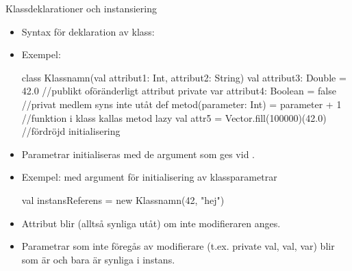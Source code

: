 \begin{Slide}{Klassdeklarationer och instansiering}\SlideFontSmall
\setlength{\leftmargini}{0pt}
\begin{itemize}
\item Syntax för deklaration av klass: \\ \vspace{0.5em}
\item Exempel: 
\begin{Code}
class Klassnamn(val attribut1: Int, attribut2: String){
  val attribut3: Double = 42.0              //publikt oföränderligt attribut
  private var attribut4: Boolean = false    //privat medlem syns inte utåt
  def metod(parameter: Int) = parameter + 1 //funktion i klass kallas metod
  lazy val attr5 = Vector.fill(100000)(42.0)     //fördröjd initialisering
}
\end{Code}

\item Parametrar initialiseras med de argument som ges vid .
\item Exempel:  med argument för initialisering av klassparametrar
\begin{Code}
val instansReferens = new Klassnamn(42, "hej")
\end{Code}

\item Attribut blir  (alltså synliga utåt) om inte modifieraren  anges.
\item Parametrar som inte föregås av modifierare (t.ex. private val, val, var) blir  som är  och bara är synliga i  instans.

\end{itemize}
\end{Slide}



